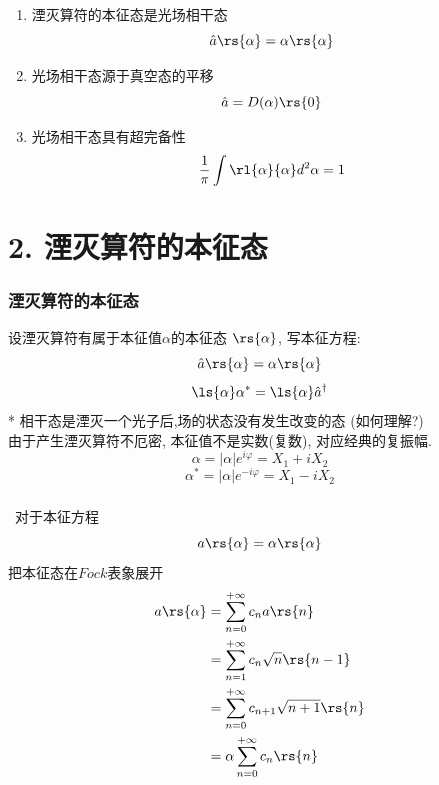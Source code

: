 \begin{frame} 
    \begin{tcolorbox4}[相干态基本命题:]
        \begin{enumerate}
            \item 湮灭算符的本征态是光场相干态
            \[ \hat{a}\rs{\alpha}= \alpha\rs{\alpha}\]
            \item 光场相干态源于真空态的平移
            \[ \hat{a} =  D(\alpha)  \rs{0}  \]
            \item 光场相干态具有超完备性
            \[ \frac{1}{\pi} \int \rl{\alpha}{\alpha}d ^2 \alpha =1\]
        \end{enumerate}  
    \end{tcolorbox4}
\end{frame}


\section{2. 湮灭算符的本征态}

\begin{frame}
    \frametitle{湮灭算符的本征态}
    设湮灭算符有属于本征值$\alpha$的本征态 $\rs{\alpha}$, 写本征方程: 
    \[ \hat{a}\rs{\alpha}= \alpha\rs{\alpha}\]
    \[ \ls{\alpha}\alpha^* =\ls{\alpha}\hat{a}^\dagger\]
    * 相干态是湮灭一个光子后,场的状态没有发生改变的态 (如何理解?)\\ 
    由于产生湮灭算符不厄密, 本征值不是实数(复数), 对应经典的复振幅. 
    \[ \alpha =\left|\alpha\right| e^{i\varphi} = X_1 + i X_2\]
    \[ \alpha^* =\left|\alpha\right| e^{-i\varphi} = X_1 - i X_2\]
\end{frame}

\begin{frame}
    \frametitle{}     
    \解 ~对于本征方程
    \[ a \rs{\alpha} = \alpha \rs{\alpha} \]
    把本征态在$Fock$表象展开 
  \[\begin{aligned}
      a \rs{\alpha} &=\sum_{n=0} ^{+\infty} c_n a \rs{n} \\
      &=  \sum_{n=1} ^{+\infty} c_n \sqrt{n} \rs{n-1} \\
      &=  \sum_{n=0} ^{+\infty} c_{n+1} \sqrt{n+1} \rs{n} \\
      &=   \alpha \sum_{n=0} ^{+\infty} c_n  \rs{n}  
  \end{aligned} \]
\end{frame}

